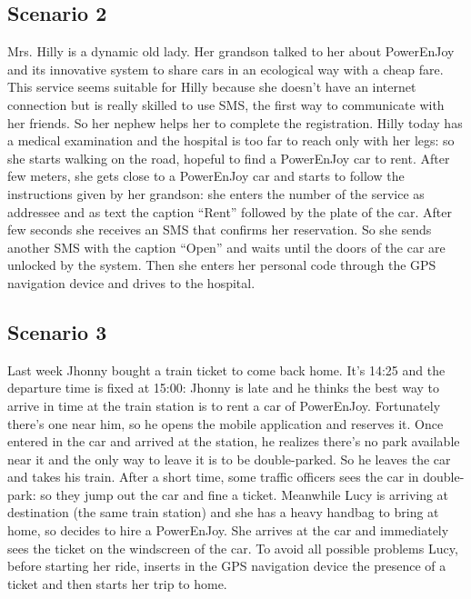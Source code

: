 \subsection{Scenario 2}
Mrs. Hilly is a dynamic old lady.
Her grandson talked to her about PowerEnJoy and its innovative system to share cars in an ecological way with a cheap fare.
This service seems suitable for Hilly because she doesn’t have an internet connection but is really skilled to use SMS, the first way to communicate with her friends.
So her nephew helps her to complete the registration.
Hilly today has a medical examination and the hospital is too far to reach only with her legs: so she starts walking on the road, hopeful to find a PowerEnJoy car to rent.
After few meters, she gets close to a PowerEnJoy car and starts to follow the instructions given by her grandson: she enters the number of the service as addressee and as text the caption “Rent” followed by the plate of the car.
After few seconds she receives an SMS that confirms her reservation.
So she sends another SMS with the caption “Open” and waits until the doors of the car are unlocked by the system.
Then she enters her personal code through the GPS navigation device and drives to the hospital.

\subsection{Scenario 3}
Last week Jhonny bought a train ticket to come back home.
It’s 14:25 and the departure time is fixed at 15:00: Jhonny is late and he thinks the best way to arrive in time at the train station is to rent a car of PowerEnJoy.
Fortunately there’s one near him, so he opens the mobile application and reserves it.
Once entered in the car and arrived at the station, he realizes there’s no park available near it and the only way to leave it is to be double-parked.
So he leaves the car and takes his train. After a short time, some traffic officers sees the car in double-park: so they jump out the car and fine a ticket.
Meanwhile Lucy is arriving at destination (the same train station) and she has a heavy handbag to bring at home, so decides to hire a PowerEnJoy.
She arrives at the car and immediately sees the ticket on the windscreen of the car.
To avoid all possible problems Lucy, before starting her ride, inserts in the GPS navigation device the presence of a ticket and then starts her trip to home.

